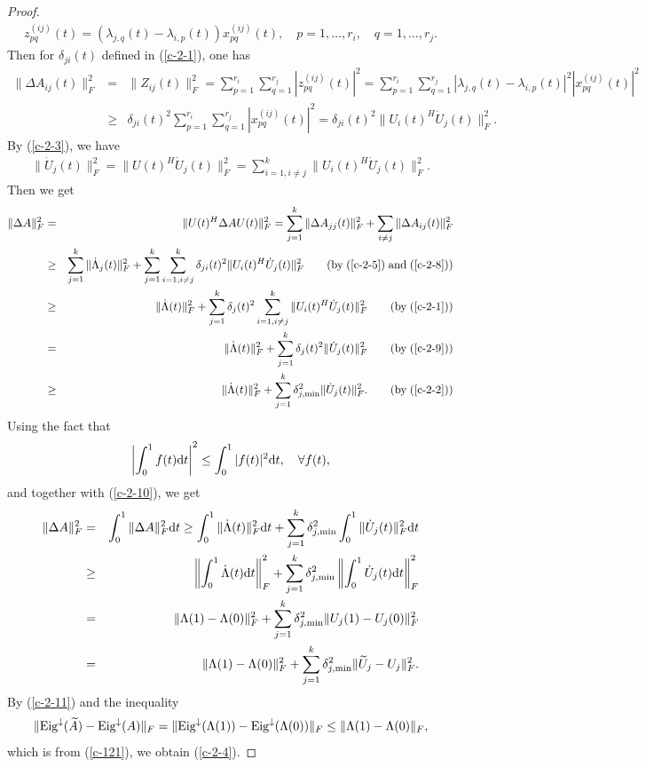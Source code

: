 \documentclass[11pt,a4paper]{article}
\numberwithin{equation}{section}
\newcommand {\wt} {\widetilde}
\begin{document}
\begin{proof}
\begin{eqnarray*}
z^{(ij)}_{pq}(t)=(\lambda_{j,q}(t)-\lambda_{i,p}(t))x_{pq}^{(ij)}(t), \quad p=1,\ldots,r_i,\quad
 q=1,\ldots,r_j.
\end{eqnarray*}
Then for $\delta_{ji}(t)$ defined in (\ref{c-2-1}), one has
\begin{eqnarray}\label{c-2-8}
\|{\Delta A_{ij}(t)}\|_F^2&=&
\|{Z_{ij}(t)}\|_F^2=\sum_{p=1}^{r_i}\sum_{q=1}^{r_j}|z_{pq}^{(ij)}(t)|^2
=\sum_{p=1}^{r_i}\sum_{q=1}^{r_j}|\lambda_{j,q}(t)-\lambda_{i,p}(t)|^2|x_{pq}^{(ij)}(t)|^2
 \nonumber\\
&\ge& \delta_{ji}(t)^2\sum_{p=1}^{r_i}\sum_{q=1}^{r_j}|x_{pq}^{(ij)}(t)|^2
=\delta_{ji}(t)^2\|{U_i(t)^H\dot U_j(t)}\|_F^2.
\end{eqnarray}
By (\ref{c-2-3}),  we have
\begin{eqnarray}\label{c-2-9}
\|{\dot U_j(t)}\|_F^2=\|{U(t)^H\dot U_j(t)}\|_F^2=\sum_{i=1,i\ne j}^k\|{U_i(t)^H\dot U_j(t)}\|_F^2.
\end{eqnarray}
Then we get
\begin{eqnarray}\label{c-2-10}
\|{\Delta A}\|_F^2&=&\|{U(t)^H\Delta AU(t)}\|_F^2=\sum_{j=1}^k\|{\Delta A_{jj}(t)}\|_F^2
+\sum_{i\ne j}\|{\Delta A_{ij}(t)}\|_F^2\nonumber\\
&\ge &\sum_{j=1}^k\|{\dot\Lambda_j(t)}\|_F^2
+\sum_{j=1}^k\sum_{i=1,i\ne j}^k\delta_{ji}(t)^2\|{U_i(t)^H\dot U_j(t)}\|_F^2   \qquad (\mbox{by}\; (\ref{c-2-5})\; \mbox{and}\; (\ref{c-2-8}) )\nonumber\\
&\ge &\|{\dot\Lambda(t)}\|_F^2+\sum_{j=1}^k\delta_j(t)^2\sum_{i=1,i\ne j}^k\|{U_i(t)^H\dot U_j(t)}\|_F^2  \qquad (\mbox{by}\; (\ref{c-2-1}))\nonumber\\
&=&\|{\dot\Lambda(t)}\|_F^2
+\sum_{j=1}^k\delta_j(t)^2\|{\dot U_j(t)}\|_F^2\qquad (\mbox{by}\; (\ref{c-2-9}))
\nonumber\\
&\ge& \|{\dot\Lambda(t)}\|_F^2+\sum_{j=1}^k\delta_{j,\min}^2\|{\dot U_j(t)}\|_F^2.\qquad (\mbox{by}\; (\ref{c-2-2}))
\end{eqnarray}
Using the fact that
\[
\left|\int_0^1f(t){\rm d}t\right|^2\leq\int_0^1|f(t)|^2{\rm d}t,\quad \forall f(t),
\]
and together with (\ref{c-2-10}), we get
\begin{eqnarray}\label{c-2-11}
\|{\Delta A}\|_F^2&=&\int_0^1\|{\Delta A}\|_F^2{\rm d}t\geq
\int_0^1\|{\dot\Lambda(t)}\|_F^2{\rm d}t
+\sum_{j=1}^k\delta_{j,\min}^2\int_0^1\|{\dot U_j(t)}\|_F^2{\rm d}t\nonumber\\
&\geq&
\left\|\int_0^1\dot\Lambda(t){\rm d}t\right\|_F^2
+\sum_{j=1}^k\delta_{j,\min}^2\left\|\int_0^1\dot U_j(t){\rm d}t\right\|_F^2\nonumber\\
&=&\|{\Lambda(1)-\Lambda(0)}\|_F^2+\sum_{j=1}^k\delta_{j,\min}^2\|{U_j(1)-U_j(0)}\|_F^2
\nonumber\\
&=&\|{\Lambda(1)-\Lambda(0)}\|_F^2+\sum_{j=1}^k\delta_{j,\min}^2\|{\wt U_j-U_j}\|_F^2.
\end{eqnarray}
By (\ref{c-2-11}) and the inequality
\[
\|{\rm Eig}^{\downarrow}(\wt A)-{\rm Eig}^{\downarrow}(A)\|_F=\|{\rm Eig}^{\downarrow}(\Lambda(1))-{\rm Eig}^{\downarrow}(\Lambda(0))\|_F\leq\|{\Lambda(1)-\Lambda(0)}\|_F,
\]
which is from (\ref{c-121}),  we obtain (\ref{c-2-4}).
\end{proof}
\end{document}
